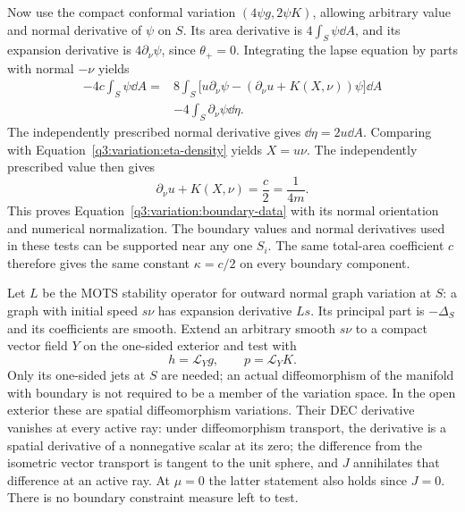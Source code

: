 Now use the compact conformal variation $(4\psi g,2\psi K)$,
allowing arbitrary value and normal derivative of $\psi$ on $S$.
Its area derivative is $4\int_S\psi\dd A$, and its expansion
derivative is $4\partial_\nu\psi$, since $\theta_+=0$.
Integrating the lapse equation by parts with normal $-\nu$ yields
\begin{equation}
 \begin{split}
 -4c\int_S\psi\dd A
    ={}&8\int_S\bigl[u\partial_\nu\psi
       -(\partial_\nu u+K(X,\nu))\psi\bigr]\dd A\\
      &-4\int_S\partial_\nu\psi\dd\eta.
 \end{split}
 \label{q3:variation:conformal-boundary}
\end{equation}
The independently prescribed normal derivative gives
$\dd\eta=2u\dd A$.  Comparing with
Equation~\eqref{q3:variation:eta-density} yields $X=u\nu$.
The independently prescribed value then gives
\[
 \partial_\nu u+K(X,\nu)=\frac c2=\frac1{4m}.
\]
This proves Equation~\eqref{q3:variation:boundary-data} with its
normal orientation and numerical normalization.  The boundary values
and normal derivatives used in these tests can be supported near any
one $S_i$.  The same total-area coefficient $c$ therefore gives the
same constant $\kappa=c/2$ on every boundary component.

Let $L$ be the MOTS stability operator for outward normal graph
variation at $S$: a graph with initial speed $s\nu$ has expansion
derivative $Ls$.  Its principal part is $-\Delta_S$ and its
coefficients are smooth.  Extend an arbitrary smooth $s\nu$ to
a compact vector field $Y$ on the one-sided exterior and test with
\[
 h=\mathcal L_Yg,\qquad p=\mathcal L_YK.
\]
Only its one-sided jets at $S$ are needed; an actual diffeomorphism
of the manifold with boundary is not required to be a member of
the variation space.  In the open exterior these are spatial
diffeomorphism variations.  Their DEC derivative vanishes at every
active ray: under diffeomorphism transport, the derivative is a
spatial derivative of a nonnegative scalar at its zero; the
difference from the isometric vector transport is tangent to the
unit sphere, and $J$ annihilates that difference at an active ray.
At $\mu=0$ the latter statement also holds since $J=0$.
There is no boundary constraint measure left to test.

